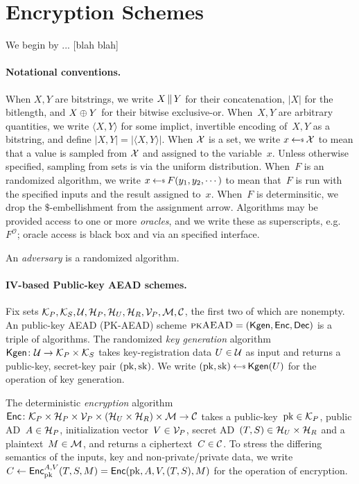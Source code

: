 \section{Encryption Schemes}
\label{sec:prelims}
\label{sec:encryption}
We begin by ... [blah blah]

\paragraph{Notational conventions. }When $X,Y$ are bitstrings, we write $X \,\|\, Y$ for their concatenation, $|X|$ for the bitlength, and $X\oplus Y$ for their bitwise exclusive-or.  When~$X,Y$ are arbitrary quantities, we write $\langle X,Y \rangle$ for some implict, invertible encoding of~$X,Y$ as a bitstring, and define $|X,Y|=|\langle X,Y\rangle|$.
When $\mathcal{X}$ is a set, we write $x \getsr \calX$ to mean that a value is sampled from $\mathcal{X}$ and assigned to the variable~$x$.  Unless otherwise specified, sampling from sets is via the uniform distribution.  
When~$F$ is an randomized algorithm, we write $x \getsr F(y_1,y_2,\cdots)$ to mean that~$F$ is run with the specified inputs and the result assigned to~$x$.  When~$F$ is determinsitic, we drop the $\$$-embellishment from the assignment arrow.  Algorithms may be provided access to one or more \emph{oracles}, and we write these as superscripts, e.g. $F^{\mathcal{O}}$; oracle access is black box and via an specified interface.  

An \emph{adversary} is a randomized algorithm.

\paragraph{IV-based Public-key AEAD schemes. }
Fix sets $\mathcal{K}_P, \mathcal{K}_S, \mathcal{U}, \mathcal{H}_P, \mathcal{H}_U, \mathcal{H}_R, \mathcal{V}_P, \mathcal{M},
\mathcal{C}$, the first two of which are nonempty.  An public-key AEAD
(PK-AEAD) scheme $\textsc{pkAEAD}=(\mathsf{Kgen},{\mathsf{Enc}},{\mathsf{Dec}})$ is a triple of algorithms.  The randomized \emph{key generation} algorithm~$\mathsf{Kgen}\colon\mathcal{U}\to\mathcal{K}_P\times\mathcal{K}_S$ takes key-registration data $U \in \mathcal{U}$ as input and returns a public-key, secret-key pair $(\mathrm{pk},\mathrm{sk})$.  We write $(\pk,\sk)\getsr\Kgen(\kreg)$ for the operation of key generation. 

The deterministic \emph{encryption} algorithm ${\mathsf{Enc}} \colon \mathcal{K}_P \times \mathcal{H}_P \times \mathcal{V}_P \times \left(\mathcal{H}_U \times \mathcal{H}_R\right) \times \mathcal{M} \to \mathcal{C}$ takes a public-key~$\mathrm{pk}\in\mathcal{K}_P$, public AD~$A \in \mathcal{H}_P$, initialization vector~$V \in \mathcal{V}_P$, secret AD~$(T,S) \in \mathcal{H}_U \times \mathcal{H}_R$ and a plaintext~$M \in \mathcal{M}$, and returns a ciphertext~$C \in \mathcal{C}$. 
To stress the differing semantics of the inputs, key and non-private/private data, we write $C\gets{\mathsf{Enc}}_{\mathrm{pk}}^{A,V}(T,S,M) ={\mathsf{Enc}}(\mathrm{pk},A,V,(T,S),M)$ for the operation of encryption.  %


